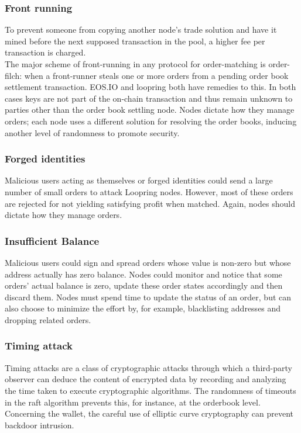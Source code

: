 \documentclass[]{article}
\begin{document}
		\subsubsection{Front running}
		To prevent someone from copying another node's trade solution 
		and have it mined before the next supposed transaction in the pool, 
		a higher fee per transaction is charged.\\ 
		The major scheme of front-running in any protocol for
		order-matching is order-filch: when a front-runner steals
		one or more orders from a pending order book settlement
		transaction. EOS.IO and loopring both have remedies to this.
		In both cases keys are not part of the on-chain transaction and thus remain unknown to parties other than the order book settling node.
		Nodes dictate how they manage orders;
		each node uses a different solution for resolving the order books, inducing another level of randomness to promote security.
			
		
		\subsubsection{Forged identities}
		Malicious users acting as themselves or forged identities 
		could send a large number of small orders to attack Loopring
		nodes. However, most of these orders are rejected 
		for not yielding satisfying profit when matched. 
		Again, nodes should dictate how they manage orders.
		
		\subsubsection{Insufficient Balance}
		Malicious users could sign and spread orders whose 
		value is non-zero but whose address actually has zero 
		balance. Nodes could monitor and notice that some orders' 
		actual balance is zero, update these order states accordingly
		and then discard them. Nodes must spend time to update
		the status of an order, but can also choose to minimize the
		effort by, for example, blacklisting addresses and dropping
		related orders.
		
		\subsubsection{Timing attack}
		 Timing attacks are a class of cryptographic attacks through which a third-party observer can deduce the content of encrypted data 
		 by recording and analyzing the time taken to execute cryptographic algorithms.
		 The randomness of timeouts in the raft algorithm prevents this, for instance, at the orderbook level.
		 Concerning the wallet, the careful use of elliptic curve cryptography can prevent backdoor intrusion.
		
\end{document}
